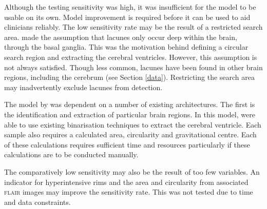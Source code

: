 Although the testing sensitivity was high, it was insufficient for the model to be usable on its own. Model improvement is required before it can be used to aid clinicians reliably. The low sensitivity rate may be the result of a restricted search area. \cite{Yokoyama2007} made the assumption that lacunes only occur deep within the brain, through the basal ganglia. This was the motivation behind defining a circular search region and extracting the cerebral ventricles. However, this assumption is not always satisfied. Though less common, lacunes have been found in other brain regions, including the cerebrum (see Section \ref{data}). Restricting the search area may inadvertently exclude lacunes from detection.

The model by \cite{Yokoyama2007} was dependent on a number of existing architectures. The first is the identification and extraction of particular brain regions. In this model, \cite{Yokoyama2007} were able to use existing binarisation techniques to extract the cerebral ventricle. Each sample also requires a calculated area, circularity and gravitational centre. Each of these calculations requires sufficient time and resources particularly if these calculations are to be conducted manually.

The comparatively low sensitivity may also be the result of too few variables. An indicator for hyperintensive rims and the area and circularity from associated \textsc{flair} images may improve the sensitivity rate. This was not tested due to time and data constraints.

